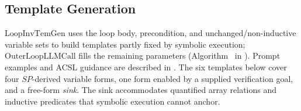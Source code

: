 \subsection{Template Generation}
\label{sec:template}

$\mathrm{LoopInvTemGen}$ uses the loop body, precondition, and unchanged/non-inductive variable sets to build templates partly fixed by symbolic execution; $\mathrm{OuterLoopLLMCall}$ fills the remaining parameters (Algorithm~ in ). Prompt examples and ACSL guidance are described in {}.
The six templates below cover four $\textit{SP}$-derived variable forms, one form enabled by a supplied verification goal, and a free-form \emph{sink}. The sink accommodates quantified array relations and inductive predicates that symbolic execution cannot anchor.

